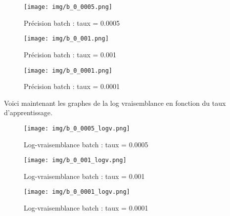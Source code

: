 \documentclass[12pt]{article}
\begin{document}
\begin{figure}[H]
\begin{center}
	\texttt{[image: img/b\_0\_0005.png]}
	\caption{Précision batch : taux = 0.0005}
\end{center}
\end{figure}
\begin{figure}[H]
\begin{center}
	\texttt{[image: img/b\_0\_001.png]}
	\caption{Précision batch : taux = 0.001}
\end{center}
\end{figure}
\begin{figure}[H]
\begin{center}
	\texttt{[image: img/b\_0\_0001.png]}
	\caption{Précision batch : taux = 0.0001}
\end{center}
\end{figure}
Voici maintenant les graphes de la log vraisemblance en fonction du taux d'apprentissage.
\begin{figure}[H]
\begin{center}
	\texttt{[image: img/b\_0\_0005\_logv.png]}
	\caption{Log-vraisemblance batch : taux = 0.0005}
\end{center}
\end{figure}
\begin{figure}[H]
\begin{center}
	\texttt{[image: img/b\_0\_001\_logv.png]}
	\caption{Log-vraisemblance  batch : taux = 0.001}
\end{center}
\end{figure}
\begin{figure}[H]
\begin{center}
	\texttt{[image: img/b\_0\_0001\_logv.png]}
	\caption{Log-vraisemblance  batch : taux = 0.0001}
\end{center}
\end{figure}
\end{document}
